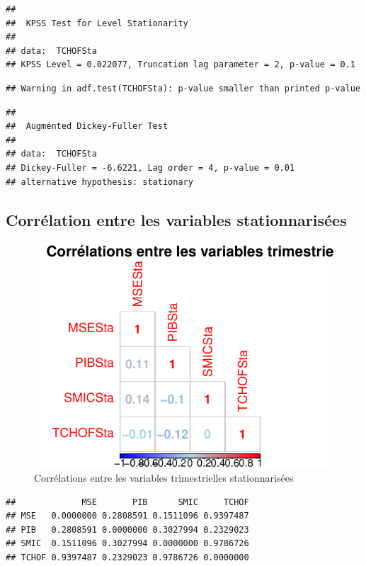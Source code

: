 \documentclass[11pt,]{article}
\begin{document}
\begin{verbatim}
## 
##  KPSS Test for Level Stationarity
## 
## data:  TCHOFSta
## KPSS Level = 0.022077, Truncation lag parameter = 2, p-value = 0.1
\end{verbatim}

\begin{verbatim}
## Warning in adf.test(TCHOFSta): p-value smaller than printed p-value
\end{verbatim}

\begin{verbatim}
## 
##  Augmented Dickey-Fuller Test
## 
## data:  TCHOFSta
## Dickey-Fuller = -6.6221, Lag order = 4, p-value = 0.01
## alternative hypothesis: stationary
\end{verbatim}

\newpage

\subsection{Corrélation entre les variables
stationnarisées}\label{correlation-entre-les-variables-stationnarisees}

\begin{figure}[htbp]
\centering
\includegraphics{Rapport_final_files/figure-latex/unnamed-chunk-23-1.pdf}
\caption{\label{fig19} Corrélations entre les variables trimestrielles
stationnarisées}
\end{figure}

\begin{verbatim}
##             MSE       PIB      SMIC     TCHOF
## MSE   0.0000000 0.2808591 0.1511096 0.9397487
## PIB   0.2808591 0.0000000 0.3027994 0.2329023
## SMIC  0.1511096 0.3027994 0.0000000 0.9786726
## TCHOF 0.9397487 0.2329023 0.9786726 0.0000000
\end{verbatim}
\end{document}
